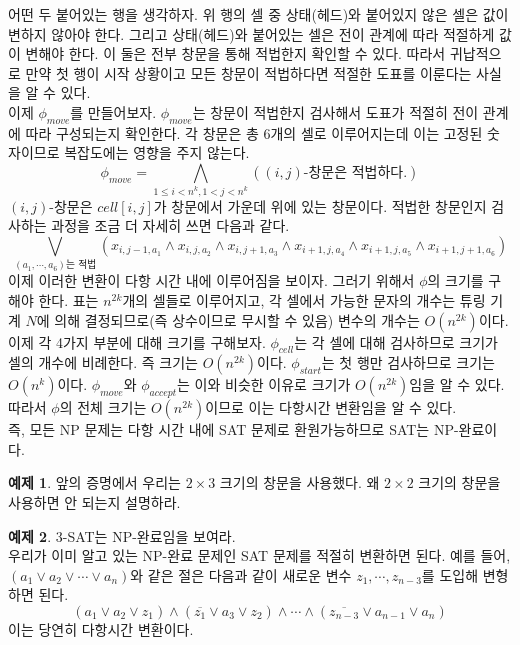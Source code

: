 \documentclass[b5paper]{book}
\theoremstyle{definition}
\newtheorem{ex}{예제}[chapter]
\newenvironment{pf*}{\pushQED{\qed}\pf}{\popQED\endpf}
\begin{document}
\begin{pf*}
\begin{table}[!ht]
         \caption{}
         \label{illegal_window}
    \end{table}
    어떤 두 붙어있는 행을 생각하자. 위 행의 셀 중 상태(헤드)와 붙어있지 않은 셀은 값이 변하지 않아야 한다.
    그리고 상태(헤드)와 붙어있는 셀은 전이 관계에 따라 적절하게 값이 변해야 한다.
    이 둘은 전부 창문을 통해 적법한지 확인할 수 있다.
    따라서 귀납적으로 만약 첫 행이 시작 상황이고 모든 창문이 적법하다면 
    적절한 도표를 이룬다는 사실을 알 수 있다.\\
    이제 $\phi_{move}$를 만들어보자. $\phi_{move}$는 창문이 적법한지 검사해서 
    도표가 적절히 전이 관계에 따라 구성되는지 확인한다. 
    각 창문은 총 6개의 셀로 이루어지는데 이는 고정된 숫자이므로 복잡도에는 영향을 주지 않는다. 
    $$\phi_{move} = \bigwedge_{1 \le i < n^k, 1<j<n^k} ((i,j)\text{-창문은 적법하다.})$$
    $(i,j)$-창문은 $cell[i,j]$가 창문에서 가운데 위에 있는 창문이다. 적법한 창문인지 검사하는 과정을
    조금 더 자세히 쓰면 다음과 같다.
    $$\bigvee_{(a_1, \cdots, a_6)\text{는 적법}} \left(
        x_{i,j-1,a_1} \wedge x_{i,j,a_2} \wedge x_{i, j+1, a_3} \wedge
        x_{i+1, j, a_4} \wedge x_{i+1, j, a_5} \wedge x_{i+1, j+1, a_6}
    \right)$$
    이제 이러한 변환이 다항 시간 내에 이루어짐을 보이자. 그러기 위해서 $\phi$의 크기를 구해야 한다. 
    표는 $n^{2k}$개의 셀들로 이루어지고, 각 셀에서 가능한 문자의 개수는 
    튜링 기계 $N$에 의해 결정되므로(즉 상수이므로 무시할 수 있음) 변수의 개수는 $O(n^{2k})$이다. \\ 
    이제 각 4가지 부분에 대해 크기를 구해보자. $\phi_{cell}$는 각 셀에 대해 검사하므로 크기가 셀의 개수에
    비례한다. 즉 크기는 $O(n^{2k})$이다. $\phi_{start}$는 첫 행만 검사하므로 크기는 $O(n^k)$이다.
    $\phi_{move}$와 $\phi_{accept}$는 이와 비슷한 이유로 크기가 $O(n^{2k})$임을 알 수 있다.
    따라서 $\phi$의 전체 크기는 $O(n^{2k})$이므로 이는 다항시간 변환임을 알 수 있다.\\
    즉, 모든 NP 문제는 다항 시간 내에 SAT 문제로 환원가능하므로 SAT는 NP-완료이다.
\end{pf*}
\begin{ex}
    앞의 증명에서 우리는 $2 \times 3$ 크기의 창문을 사용했다. 왜 $2 \times 2$ 크기의 창문을 사용하면 안 되는지 설명하라. 
\end{ex}
\begin{ex}
    3-SAT는 NP-완료임을 보여라. \\ 
    우리가 이미 알고 있는 NP-완료 문제인 SAT 문제를 적절히 변환하면 된다. 예를 들어, $(a_1 \vee a_2 \vee \cdots \vee a_n)$와
    같은 절은 다음과 같이 새로운 변수 $z_1, \cdots, z_{n-3}$를 도입해 변형하면 된다.
    $$(a_1 \vee a_2 \vee z_1) \wedge (\overline{z_1} \vee a_3 \vee z_2) \wedge \cdots \wedge 
    (\overline{z_{n-3}} \vee a_{n-1} \vee a_{n})$$
    이는 당연히 다항시간 변환이다.
\end{ex}
\end{document}
